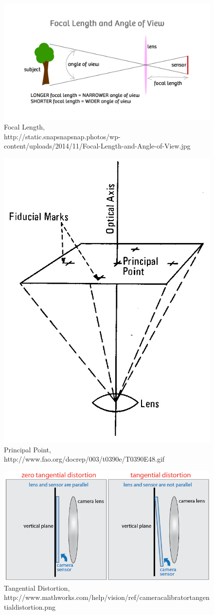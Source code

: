\documentclass[paper=a4, fontsize=11pt]{scrartcl} %
\numberwithin{equation}{section} %
\numberwithin{figure}{section} %
\numberwithin{table}{section} %
\begin{document}
\begin{figure}[H]
	\centering
	\includegraphics[width = 0.6\linewidth]{focal_length.jpg}
	\caption{Focal Length, \\http://static.snapsnapsnap.photos/wp-content/uploads/2014/11/Focal-Length-and-Angle-of-View.jpg}
	\label{ref_focal}
\end{figure}

\begin{figure}[H]
	\centering
	\includegraphics[width = 0.6\linewidth]{principal.jpg}
	\caption{Principal Point, \\http://www.fao.org/docrep/003/t0390e/T0390E48.gif}
	\label{ref_principal}
\end{figure}

\begin{figure}[H]
	\centering
	\includegraphics[width = 0.6\linewidth]{tangential.png}
	\caption{Tangential Distortion, \\http://www.mathworks.com/help/vision/ref/cameracalibrator\textunderscore tangentialdistortion.png}
	\label{ref_tangential}
\end{figure}
\end{document}
